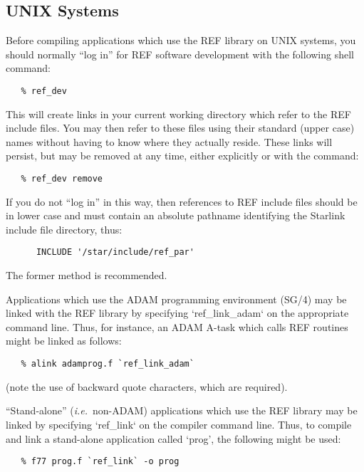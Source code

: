 \subsection{UNIX Systems}

Before compiling applications which use the REF library on UNIX systems, you
should normally ``log in'' for REF software development with the following
shell command:

\begin{verbatim}
   % ref_dev
\end{verbatim}

This will create links in your current working directory which refer to the REF
include files. You may then refer to these files using their standard (upper
case) names without having to know where they actually reside. These links will
persist, but may be removed at any time, either explicitly or with the command:

\begin{verbatim}
   % ref_dev remove
\end{verbatim}

If you do not ``log in'' in this way, then references to REF include files
should be in lower case and must contain an absolute pathname identifying the
Starlink include file directory, thus:

\begin{verbatim}
      INCLUDE '/star/include/ref_par'
\end{verbatim}

The former method is recommended.

Applications which use the ADAM programming environment (SG/4) may be linked
with the REF library by specifying `ref\_link\_adam` on the appropriate command
line. Thus, for instance, an ADAM A-task which calls REF routines might be
linked as follows:

\begin{verbatim}
   % alink adamprog.f `ref_link_adam`
\end{verbatim}

(note the use of backward quote characters, which are required).

``Stand-alone'' ({\em i.e.}\ non-ADAM) applications which use the REF library
may be linked by specifying `ref\_link` on the compiler command line. Thus, to
compile and link a stand-alone application called `prog', the following might
be used:

\begin{verbatim}
   % f77 prog.f `ref_link` -o prog
\end{verbatim}

